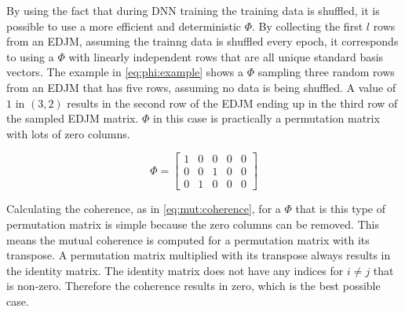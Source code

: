 By using the fact that during DNN training the training data is shuffled, it is possible to use a more efficient and deterministic $\Phi$. By collecting the first $l$ rows from an EDJM, assuming the trainng data is shuffled every epoch, it corresponds to using a $\Phi$ with linearly independent rows that are all unique standard basis vectors. The example in \eqref{eq:phi:example} shows a $\Phi$ sampling three random rows from an EDJM that has five rows, assuming no data is being shuffled. A value of $1$ in $(3,2)$ results in the second row of the EDJM ending up in the third row of the sampled EDJM matrix. $\Phi$ in this case is practically a permutation matrix with lots of zero columns.

\begin{equation} \label{eq:phi:example}
    \Phi =
    \begin{bmatrix}
    1 & 0 & 0 & 0 & 0 \\
    0 & 0 & 1 & 0 & 0 \\
    0 & 1 & 0 & 0 & 0
    \end{bmatrix}
  \end{equation}

Calculating the coherence, as in \eqref{eq:mut:coherence}, for a $\Phi$ that is this type of permutation matrix is simple because the zero columns can be removed. This means the mutual coherence is computed for a permutation matrix with its transpose. A permutation matrix multiplied with its transpose always results in the identity matrix. The identity matrix does not have any indices for $i \neq j$ that is non-zero. Therefore the coherence results in zero, which is the best possible case.

